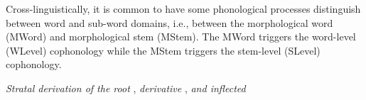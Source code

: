 Cross-linguistically, it is common to have some phonological processes distinguish between word and  sub-word domains, i.e., between  the morphological word (MWord) and morphological stem (MStem). The MWord triggers the word-level (WLevel) cophonology  while the MStem triggers the stem-level (SLevel) cophonology.  










\begin{exe}
	
	\ex \textit{Stratal derivation of the root} , \textit{derivative} , \textit{and inflected} \label{dissderivation table: WA amusin amusinov amusinner}\\
	
	\hspace*{-1cm}
\end{exe}
